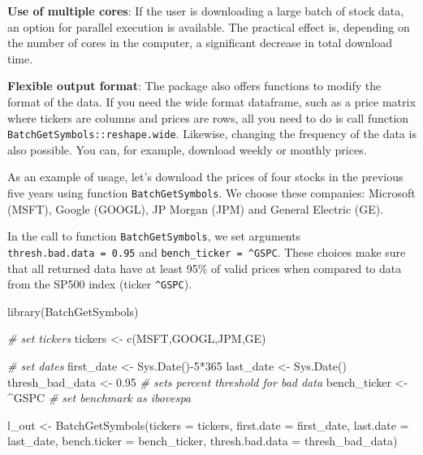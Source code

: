 \documentclass[
  12pt,
]{book}
\newenvironment{Shaded}{\begin{snugshade}}{\end{snugshade}}
\newcommand{\AttributeTok}[1]{\textcolor[rgb]{0.61,0.61,0.61}{#1}}
\newcommand{\CommentTok}[1]{\textcolor[rgb]{0.37,0.37,0.37}{\textit{#1}}}
\newcommand{\DecValTok}[1]{\textcolor[rgb]{0.06,0.06,0.06}{#1}}
\newcommand{\FloatTok}[1]{\textcolor[rgb]{0.06,0.06,0.06}{#1}}
\newcommand{\FunctionTok}[1]{\textcolor[rgb]{0,0,0}{#1}}
\newcommand{\NormalTok}[1]{#1}
\newcommand{\OtherTok}[1]{\textcolor[rgb]{0.37,0.37,0.37}{#1}}
\newcommand{\SpecialCharTok}[1]{\textcolor[rgb]{0,0,0}{#1}}
\newcommand{\StringTok}[1]{\textcolor[rgb]{0.5,0.5,0.5}{#1}}
\begin{document}
\textbf{Use of multiple cores}: If the user is downloading a large batch of stock data, an option for parallel execution is available. The practical effect is, depending on the number of cores in the computer, a significant decrease in total download time.

\textbf{Flexible output format}: The package also offers functions to modify the format of the data. If you need the wide format dataframe, such as a price matrix where tickers are columns and prices are rows, all you need to do is call function \texttt{BatchGetSymbols::reshape.wide}. Likewise, changing the frequency of the data is also possible. You can, for example, download weekly or monthly prices.

As an example of usage, let's download the prices of four stocks in the previous five years using function \texttt{BatchGetSymbols}. We choose these companies: Microsoft (MSFT), Google (GOOGL), JP Morgan (JPM) and General Electric (GE).  

In the call to function \texttt{BatchGetSymbols}, we set arguments \texttt{thresh.bad.data\ =\ 0.95} and \texttt{bench\_ticker\ =\ \textquotesingle{}\^{}GSPC\textquotesingle{}}. These choices make sure that all returned data have at least 95\% of valid prices when compared to data from the SP500 index (ticker \texttt{\textquotesingle{}\^{}GSPC\textquotesingle{}}).

\begin{Shaded}
\begin{Highlighting}[]
\FunctionTok{library}\NormalTok{(BatchGetSymbols)}

\CommentTok{\# set tickers}
\NormalTok{tickers }\OtherTok{\textless{}{-}} \FunctionTok{c}\NormalTok{(}\StringTok{\textquotesingle{}MSFT\textquotesingle{}}\NormalTok{,}\StringTok{\textquotesingle{}GOOGL\textquotesingle{}}\NormalTok{,}\StringTok{\textquotesingle{}JPM\textquotesingle{}}\NormalTok{,}\StringTok{\textquotesingle{}GE\textquotesingle{}}\NormalTok{)}

\CommentTok{\# set dates}
\NormalTok{first\_date }\OtherTok{\textless{}{-}} \FunctionTok{Sys.Date}\NormalTok{()}\SpecialCharTok{{-}}\DecValTok{5}\SpecialCharTok{*}\DecValTok{365}
\NormalTok{last\_date }\OtherTok{\textless{}{-}} \FunctionTok{Sys.Date}\NormalTok{()}
\NormalTok{thresh\_bad\_data }\OtherTok{\textless{}{-}} \FloatTok{0.95}   \CommentTok{\# sets percent threshold for bad data}
\NormalTok{bench\_ticker }\OtherTok{\textless{}{-}} \StringTok{\textquotesingle{}\^{}GSPC\textquotesingle{}}   \CommentTok{\# set benchmark as ibovespa}

\NormalTok{l\_out }\OtherTok{\textless{}{-}} \FunctionTok{BatchGetSymbols}\NormalTok{(}\AttributeTok{tickers =}\NormalTok{ tickers,}
                         \AttributeTok{first.date =}\NormalTok{ first\_date,}
                         \AttributeTok{last.date =}\NormalTok{ last\_date,}
                         \AttributeTok{bench.ticker =}\NormalTok{ bench\_ticker,}
                         \AttributeTok{thresh.bad.data =}\NormalTok{ thresh\_bad\_data)}
\end{Highlighting}
\end{Shaded}
\end{document}
